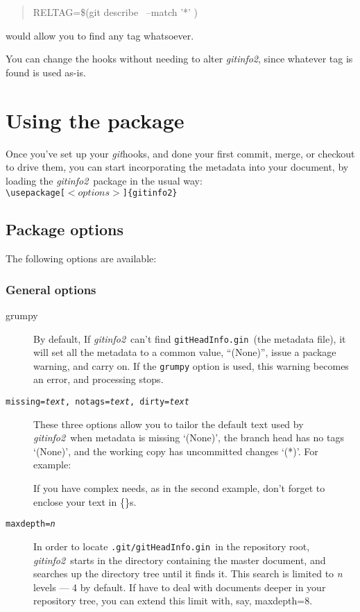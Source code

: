 \documentclass[draft,a4paper,12pt,twoside,openany]{memoir}
\newcommand{\sfit}[1]{\textit{#1}}
\newcommand{\git}{\sfit{git}}
\newcommand{\tpname}{\sfit{gitinfo2}}
\newcommand{\ginname}{gitHeadInfo.gin}
\newcommand{\metaname}{\texttt{\ginname}}
\newcommand{\metapath}{\texttt{.git/\ginname}}
\begin{document}
\begin{quotation}
{\ttfamily
RELTAG=\$(git describe \textellipsis\ --match '*' \textellipsis)
}
\end{quotation}
would allow you to find any tag whatsoever.

You can change the hooks without needing to alter \tpname,
since whatever tag is found is used as-is.

\chapter{Using the package}
\label{ch:using}
Once you've set up your \git hooks, and done your first commit,
merge, or checkout to drive them,
you can start incorporating the metadata into your document, 
by loading the \tpname\ package in the usual way:\\[0.5\baselineskip]
\texttt{\textbackslash usepackage[$<options>$]\{gitinfo2\}}

\section{Package options}

The following options are available:

\subsection{General options}

\begin{description}

\item[grumpy]
By default, If \tpname\ can't find \metaname\ (the metadata file),
it will set all the metadata to a common value, ``(None)'',
issue a package warning, and carry on.
If the \texttt{grumpy} option is used,
this warning becomes an error, and processing stops.

\item[\texttt{missing=\textit{text}, notags=\textit{text}, dirty=\textit{text}}]
These three options allow you to tailor the default text used by \tpname\ when
metadata is missing `(None)', 
the branch head has no tags `(None)', 
and the working copy has uncommitted changes `(*)'.
For example:

\begin{quote}
{\ttfamily
[missing=Help!,notags=\{No tags?\},dirty=Yuck]
}
\end{quote}
If you have complex needs, as in the second example,
don't forget to enclose your text in \{\}s.

\item[\texttt{maxdepth=\textit{n}}]
In order to locate \metapath\ in the repository root,
\tpname\ starts in the directory containing the master document,
and searches up the directory tree until it finds it.
This search is limited to {\ttfamily\itshape n} levels --- 4 by default.
If have to deal with documents
deeper in your repository tree, you can extend this limit with, say,
{\ttfamily maxdepth=8}.

\end{description}
\clearpage
\end{document}
